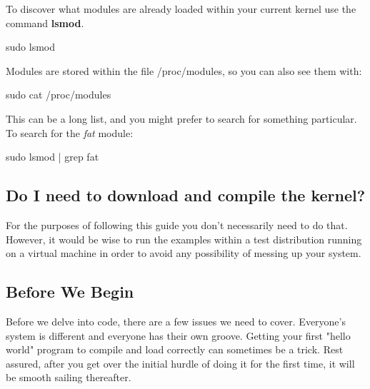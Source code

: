 \documentclass[10pt, oneside]{book}
\begin{document}
To discover what modules are already loaded within your current kernel use the command \textbf{lsmod}.
\begin{codebash}
sudo lsmod
\end{codebash}

Modules are stored within the file /proc/modules, so you can also see them with:
\begin{codebash}
sudo cat /proc/modules
\end{codebash}

This can be a long list, and you might prefer to search for something particular.
To search for the \emph{fat} module:
\begin{codebash}
sudo lsmod | grep fat
\end{codebash}

\subsection{Do I need to download and compile the kernel?}
\label{sec:buildkernel}
For the purposes of following this guide you don't necessarily need to do that.
However, it would be wise to run the examples within a test distribution running on a virtual machine in order to avoid any possibility of messing up your system.

\subsection{Before We Begin}
\label{sec:preparation}
Before we delve into code, there are a few issues we need to cover.
Everyone's system is different and everyone has their own groove.
Getting your first "hello world" program to compile and load correctly can sometimes be a trick.
Rest assured, after you get over the initial hurdle of doing it for the first time, it will be smooth sailing thereafter.
\end{document}
